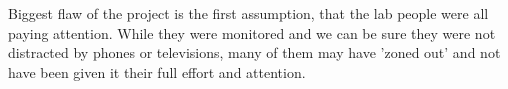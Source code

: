 \documentclass{article}
\begin{document}
Biggest flaw of the project is the first assumption, that the lab people were all paying attention.
While they were monitored and we can be sure they were not distracted by phones or televisions, many of them may have 'zoned out' and not have been given it their full effort and attention.



\singlespacing
\printbibliography


\end{document}
